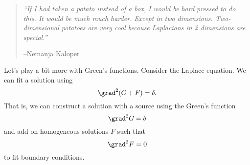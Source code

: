 \begin{quote}
    \textit{``If I had taken a potato instead of a box, I would be hard pressed to do this. It would be much much harder. Except in two dimensions. Two-dimensional potatoes are very cool because Laplacians in 2 dimensions are special.''}
    
    --Nemanja Kaloper
\end{quote}

Let's play a bit more with Green's functions. Consider the Laplace equation. We can fit a solution using
\begin{equation}
    \grad^2(G+F) = \delta.
\end{equation}
That is, we can construct a solution with a source using the Green's function
\begin{equation}
    \grad^2 G = \delta
\end{equation}
and add on homogeneous solutions $F$ such that
\begin{equation}
    \grad^2 F =0
\end{equation}
to fit boundary conditions.

